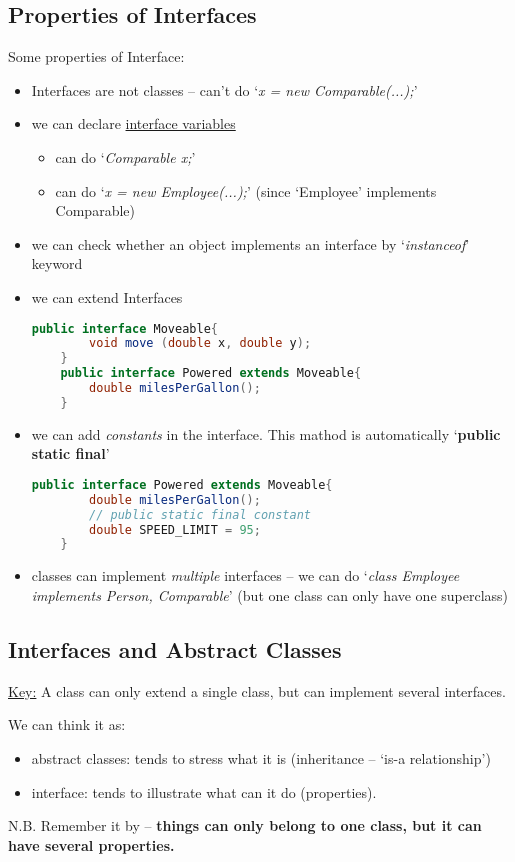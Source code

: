 \documentclass[12pt]{article}
\begin{document}
\subsection{Properties of Interfaces}
Some properties of Interface:
\begin{itemize}
    \item Interfaces are not classes -- can't do `\emph{x = new Comparable(...);}'
    \item we can declare \underline{interface variables}
    \begin{itemize}
        \item can do `\emph{Comparable x;}'
        \item can do `\emph{x = new Employee(...);}' (since `Employee' implements Comparable)
    \end{itemize}
    \item we can check whether an object implements an interface by `\emph{instanceof}' keyword
    \item we can extend Interfaces
    \begin{lstlisting}[language=Java]
    public interface Moveable{
        void move (double x, double y);
    }
    public interface Powered extends Moveable{
        double milesPerGallon();
    }
    \end{lstlisting}
    \item we can add \emph{constants} in the interface. This mathod is automatically `\textbf{public static final}'
    \begin{lstlisting}[language=Java]
    public interface Powered extends Moveable{
        double milesPerGallon();
        // public static final constant
        double SPEED_LIMIT = 95; 
    }
    \end{lstlisting}
    \item classes can implement \emph{multiple} interfaces -- we can do `\emph{class Employee implements Person, Comparable}'
    (but one class can only have one superclass)
\end{itemize}

\subsection{Interfaces and Abstract Classes}
\underline{Key:} A class can only extend a single class, but can implement several interfaces.

We can think it as:
\begin{itemize}
    \item abstract classes: tends to stress what it is (inheritance -- `is-a relationship')
    \item interface: tends to illustrate what can it do (properties).
\end{itemize}
N.B. Remember it by -- \textbf{things can only belong to one class, but it can have several properties.}
\end{document}
